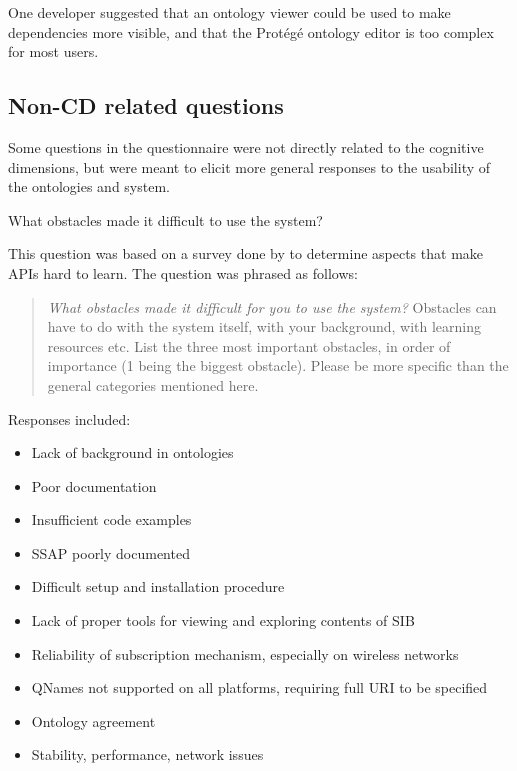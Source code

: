 One developer suggested that an ontology viewer could be used to make dependencies more visible, and that the Prot\'eg\'e ontology editor is too complex for most users.


\subsection{Non-CD related questions}

Some questions in the questionnaire were not directly related to the cognitive dimensions, but were meant to elicit more general responses to the usability of the ontologies and system.\\

\begin{cdquestion}
	What obstacles made it difficult to use the system?
\end{cdquestion}

This question was based on a survey done by \cite{Robillard2009} to determine aspects that make \acp{API} hard to learn. The question was phrased as follows:

\begin{quote}
\emph{What obstacles made it difficult for you to use the system?} Obstacles can have to do with the system itself, with your background, with learning resources etc. List the three most important obstacles, in order of importance (1 being the biggest obstacle). Please be more specific than the general categories mentioned here.
\end{quote}

Responses included:

\begin{itemize}
	\item Lack of background in ontologies
	\item Poor documentation
	\item Insufficient code examples
	\item \ac{SSAP} poorly documented
	\item Difficult setup and installation procedure
	\item Lack of proper tools for viewing and exploring contents of \ac{SIB}
	\item Reliability of subscription mechanism, especially on wireless networks
	\item QNames not supported on all platforms, requiring full \ac{URI} to be specified
	\item Ontology agreement
	\item Stability, performance, network issues
\end{itemize}
\vspace{0.5cm}


